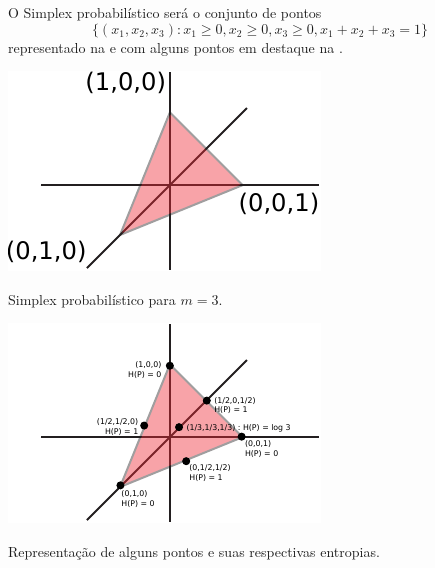  \begin{example}[Simplex Probabilístico com $m=3$]
  O Simplex probabilístico será o conjunto de pontos
  \begin{equation}
  \{ (x_1, x_2, x_3)  :  x_1 \geq 0 , x_2 \geq 0 , x_3 \geq 0 , x_1 + x_2 + x_3 = 1 \}
  \end{equation}
  representado na  e com alguns pontos em destaque na .
    \begin{marginfigure}
    \centering
    \includegraphics[width=\textwidth]{figures/prob-simplex-3.pdf}
    \caption{Simplex probabilístico para $m=3$.}
    \label{fig:prob-simplex-3}
    \end{marginfigure}

    \begin{marginfigure}
    \centering
    \includegraphics[width=\textwidth]{figures/prob-simplex-types3.pdf}
    \caption{Representação de alguns pontos e suas respectivas entropias.}
    \label{fig:prob-simplex-3t}
    \end{marginfigure}
  \end{example}



